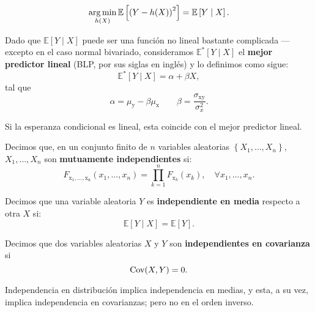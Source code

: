 \documentclass[8pt,a4paper]{extarticle}
\begin{document}
\begin{multicols}{3}
	\begin{boxprop}[]
		\[
			\operatorname*{\arg \min}_{h(X)} \mathbb{E}\left[ \left( Y - h(X) \right)^2  \right] = \mathbb{E}\left[ Y  \mid X \right]
			.\]
	\end{boxprop}

	\begin{boxdef}
		Dado que $\mathbb{E}[Y  \mid X]$ puede ser una función no lineal bastante complicada --- excepto en el caso normal bivariado, consideramos $\mathbb{E}^* [Y  \mid X]$ el \textbf{mejor predictor lineal} (BLP, por sus siglas en inglés) y lo definimos como sigue:
		\[
			\mathbb{E}^*\left[ Y  \mid X \right] = \alpha + \beta X
			,\]
		tal que
		\[
			\alpha = \mu_{\mathrm{y}} - \beta \mu_{\mathrm{x}} \qquad \beta = \frac{\sigma_{\mathrm{xy}}}{\sigma^2_{x}}
			.\]
	\end{boxdef}

	\begin{boxtheo}[]
		Si la esperanza condicional es lineal, esta coincide con el mejor predictor lineal.
	\end{boxtheo}

	\sectionbreak

	\begin{boxdef}
		Decimos que, en un conjunto finito de $n$ variables aleatorias $\left\{ X_1, \ldots, X_n \right\}$, $X_1, \ldots, X_n$ son \textbf{mutuamente independientes} si:
		\[
			F_{\mathrm{x_1,\ldots,x_n}} (x_1, \ldots, x_n) = \prod_{k=1}^{n} F_{\mathrm{x}_k} (x_k), \quad \forall x_1, \ldots, x_n
			.\]
	\end{boxdef}

	\begin{boxdef}
		Decimos que una variable aleatoria $Y$ es \textbf{independiente en media} respecto a otra $X$ si:
		\[
			\mathbb{E}[Y  \mid X] = \mathbb{E}[Y]
			.\]
	\end{boxdef}

	\begin{boxdef}
		Decimos que dos variables aleatorias $X$ y $Y$ son \textbf{independientes en covarianza} si
		\[
			\text{\normalfont Cov}(X,Y) = 0
			.\]
	\end{boxdef}

	\begin{boxtheo}[]
		Independencia en distribución implica independencia en medias, y esta, a su vez, implica independencia en covarianzas; pero no en el orden inverso.
	\end{boxtheo}


\end{multicols}
\end{document}
